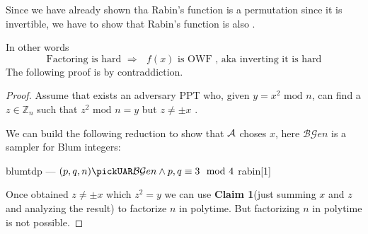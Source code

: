 
Since we have already shown tha Rabin's function is a permutation since it is invertible, we have to show that Rabin's function is also \owf.

In other words
\[
    \text{Factoring is hard } \Rightarrow \text{ $f(x)$ is OWF , aka inverting
    it is hard}
\]
The following proof is by contraddiction.
\begin{proof}
    Assume that exists an adversary PPT who, given $y=x^{2} \text{ mod } n$, can find a $z \in \mathbb{Z}_{n} $ such that $z^{2} \text{ mod } n=y$ but $z\neq \pm x$ .

    We can build the following reduction to show that $\mathcal{A}$ choses $x$, here $\mathcal{BG}en$ is a sampler for Blum integers:

    \begin{cryptoredux}
        {blumtdp}
        {---}
        {$(p, q, n) \pickUAR \mathcal{BG}en \wedge p,q \equiv 3 \mod 4$}
        {rabin}[1]



        
    \end{cryptoredux}

    
    Once obtained $z\neq \pm x$ which $z^{2}=y$ we can use \textbf{Claim 1}(just summing $x$ and $z$ and analyzing the result)  to factorize $n$ in polytime. But factorizing $n$ in polytime is not possible.
\end{proof}
